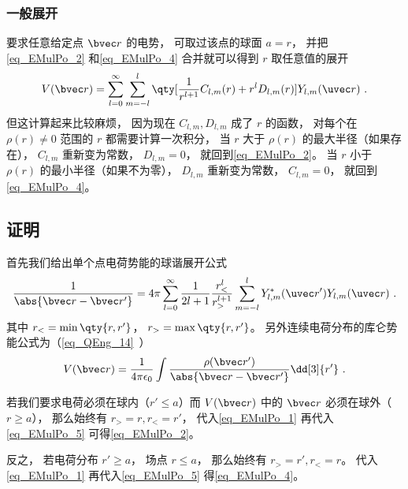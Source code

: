 \subsubsection{一般展开}
要求任意给定点 $\bvec r$ 的电势， 可取过该点的球面 $a = r$， 并把\autoref{eq_EMulPo_2} 和\autoref{eq_EMulPo_4} 合并就可以得到 $r$ 取任意值的展开
\begin{equation}
V(\bvec r) = \sum_{l = 0}^\infty\sum_{m = -l}^l \qty[\frac{1}{r^{l+1}} C_{l,m}(r) + r^l D_{l,m}(r)] Y_{l,m}(\uvec r)~.
\end{equation}
但这计算起来比较麻烦， 因为现在 $C_{l,m}, D_{l,m}$ 成了 $r$ 的函数， 对每个在 $\rho(r)\ne 0$ 范围的 $r$ 都需要计算一次积分， 当 $r$ 大于 $\rho(r)$ 的最大半径（如果存在）， $C_{l,m}$ 重新变为常数， $D_{l,m}= 0$， 就回到\autoref{eq_EMulPo_2}。 当 $r$ 小于 $\rho(r)$ 的最小半径（如果不为零）， $D_{l,m}$ 重新变为常数， $C_{l,m} = 0$， 就回到\autoref{eq_EMulPo_4}。

\subsection{证明}
首先我们给出单个点电荷势能的球谐展开公式
\begin{equation}\label{eq_EMulPo_1}
\frac{1}{\abs{\bvec r - \bvec r'}} = 4\pi \sum_{l=0}^{\infty} \frac{1}{2l+1} \frac{r_<^l}{r_>^{l+1}} \sum_{m = -l}^l Y_{l,m}^*(\uvec r') Y_{l,m}(\uvec r)~.
\end{equation}
其中 $r_< = \min\qty{r, r'}$， $r_> = \max\qty{r, r'}$。 另外连续电荷分布的库仑势能公式为（\autoref{eq_QEng_14}~）
\begin{equation}\label{eq_EMulPo_5}
V(\bvec r) = \frac{1}{4\pi\epsilon_0}\int \frac{\rho(\bvec r')}{\abs{\bvec r - \bvec r'}} \dd[3]{r'}~.
\end{equation}

若我们要求电荷必须在球内（$r' \leqslant a$）而 $V(\bvec r)$ 中的 $\bvec r$ 必须在球外（$r \geqslant a$）， 那么始终有 $r_> = r, r_< = r'$， 代入\autoref{eq_EMulPo_1} 再代入\autoref{eq_EMulPo_5} 可得\autoref{eq_EMulPo_2}。

反之， 若电荷分布 $r' \geqslant a$， 场点 $r \leqslant a$， 那么始终有 $r_> = r', r_< = r$。 代入\autoref{eq_EMulPo_1} 再代入\autoref{eq_EMulPo_5} 得\autoref{eq_EMulPo_4}。
